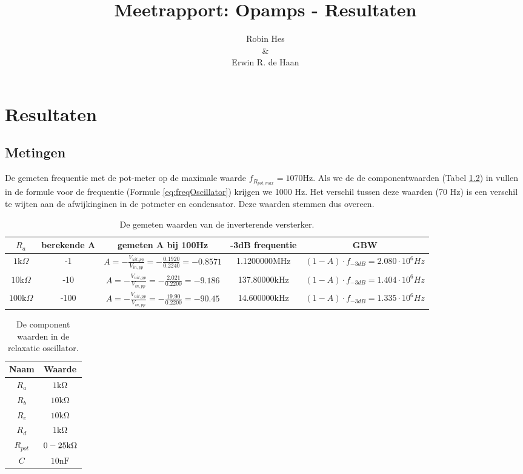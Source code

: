 \documentclass{report}
\title{Meetrapport: Opamps - Resultaten}
\author{Robin Hes\\\&\\Erwin R. de Haan}
\begin{document}
\chapter{Resultaten}
\section{Metingen}
De gemeten frequentie met de pot-meter op de maximale waarde $f_{R_{pot,max}} = 1070 \mathrm{Hz}$. Als we de de componentwaarden (Tabel \ref{tab:components}) in vullen in de formule voor de frequentie (Formule \ref{eq:freqOscillator}) krijgen we 1000 Hz. Het verschil tussen deze waarden (70 Hz) is een verschil te wijten aan de afwijkinginen in de potmeter en condensator. Deze waarden stemmen dus overeen.
\begin{table}[H]
\caption{De gemeten waarden van de inverterende versterker.}
\label{tab:invAmpMeasured}
\centering
\begin{tabular}{|c|c|c|c|c|}
\hline
$R_a$ & berekende A & gemeten A bij 100Hz & -3dB frequentie & GBW\\
\hline
$1 \mathrm{k}\Omega$& -1 & $A=-\frac{V_{uit,pp}}{V_{in,pp}}=-\frac{0.1920}{0.2240}=-0.8571$ & 1.1200000MHz&$(1-A)\cdot f_{-3dB}=2.080\cdot10^6 Hz$ \\
\hline
$10 \mathrm{k}\Omega$
&-10 & $A=-\frac{V_{uit,pp}}{V_{in,pp}}=-\frac{2.021}{0.2200}=-9.186$ & 137.80000kHz&$(1-A)\cdot f_{-3dB}=1.404\cdot10^6 Hz$\\
\hline
$100 \mathrm{k}\Omega$
 & -100 & $A=-\frac{V_{uit,pp}}{V_{in,pp}}=-\frac{19.90}{0.2200}=-90.45$&14.600000kHz&$(1-A)\cdot f_{-3dB}=1.335\cdot10^6 Hz$\\
\hline
\end{tabular}
\end{table}
\begin{table}[H]
\caption{De component waarden in de relaxatie oscillator.}
\label{tab:components}
\centering
\begin{tabular}{|c|c|}
\hline
Naam & Waarde\\
\hline
$R_a$ & $1 \mathrm{k\Omega}$\\
\hline
$R_b$ & $10 \mathrm{k\Omega}$\\
\hline
$R_c$ & $10 \mathrm{k\Omega}$\\
\hline
$R_d$ & $1 \mathrm{k\Omega}$\\
\hline
$R_{pot}$ & $0\--25 \mathrm{k\Omega}$\\
\hline
$C$ & $10 \mathrm{nF}$\\
\hline
\end{tabular}
\end{table}
\end{document}

